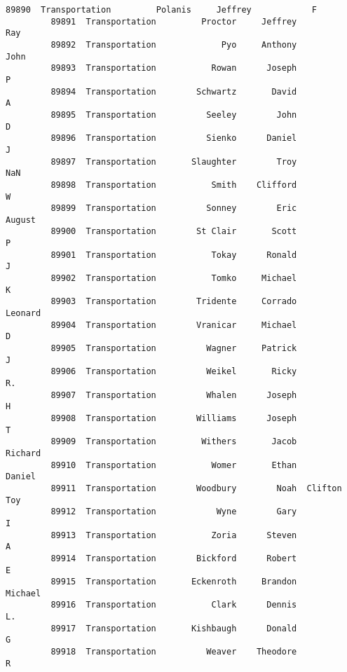 \documentclass[11pt]{article}
\begin{document}
\begin{Verbatim}[commandchars=\\\{\}]
         89890  Transportation         Polanis     Jeffrey            F   
         89891  Transportation         Proctor     Jeffrey          Ray   
         89892  Transportation             Pyo     Anthony         John   
         89893  Transportation           Rowan      Joseph            P   
         89894  Transportation        Schwartz       David            A   
         89895  Transportation          Seeley        John            D   
         89896  Transportation          Sienko      Daniel            J   
         89897  Transportation       Slaughter        Troy          NaN   
         89898  Transportation           Smith    Clifford            W   
         89899  Transportation          Sonney        Eric       August   
         89900  Transportation        St Clair       Scott            P   
         89901  Transportation           Tokay      Ronald            J   
         89902  Transportation           Tomko     Michael            K   
         89903  Transportation        Tridente     Corrado      Leonard   
         89904  Transportation        Vranicar     Michael            D   
         89905  Transportation          Wagner     Patrick            J   
         89906  Transportation          Weikel       Ricky           R.   
         89907  Transportation          Whalen      Joseph            H   
         89908  Transportation        Williams      Joseph            T   
         89909  Transportation         Withers       Jacob      Richard   
         89910  Transportation           Womer       Ethan       Daniel   
         89911  Transportation        Woodbury        Noah  Clifton Toy   
         89912  Transportation            Wyne        Gary            I   
         89913  Transportation           Zoria      Steven            A   
         89914  Transportation        Bickford      Robert            E   
         89915  Transportation       Eckenroth     Brandon      Michael   
         89916  Transportation           Clark      Dennis           L.   
         89917  Transportation       Kishbaugh      Donald            G   
         89918  Transportation          Weaver    Theodore            R   
         

\end{Verbatim}
\end{document}
